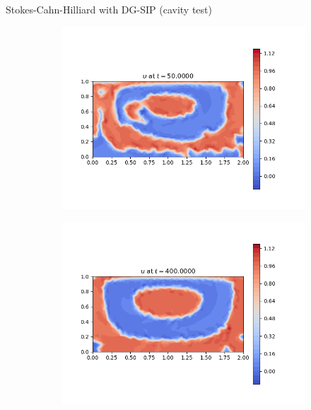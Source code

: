\begin{frame}{Stokes-Cahn-Hilliard with DG-SIP {\small(cavity test)}}
\begin{figure}[t]
		\begin{subfigure}{0.49\textwidth}
			\centering
			\includegraphics[scale=0.28]{img/stokes-cahn-hilliard/u_DG-SIP-Sig+Eyre_stokes_nt-40000_t-50.00000_P1.png}
		\end{subfigure}
		\hspace*{-1.5cm}
		\begin{subfigure}{0.49\textwidth}
			\centering
			\includegraphics[scale=0.28]{img/stokes-cahn-hilliard/u_DG-SIP-Sig+Eyre_stokes_nt-40000_t-400.00000_P1.png}
		\end{subfigure}
	\end{figure}
\end{frame}


